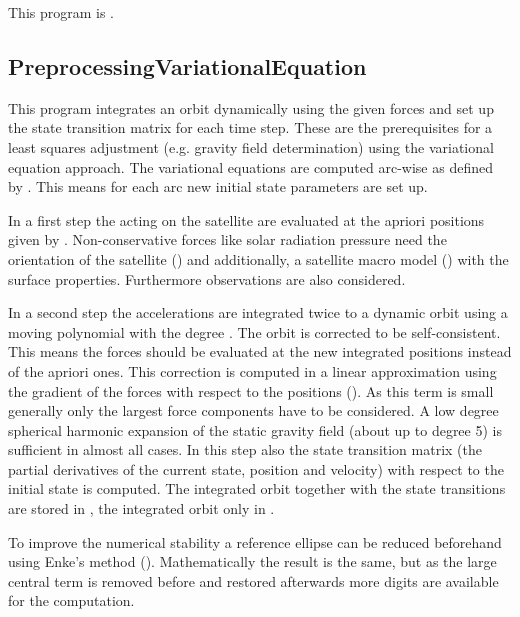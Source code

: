 This program is .
\clearpage
\subsection{PreprocessingVariationalEquation}\label{PreprocessingVariationalEquation}
This program integrates an orbit dynamically using the given forces and set up the state transition matrix
for each time step. These are the prerequisites for a least squares adjustment (e.g. gravity field determination) using
the variational equation approach. The variational equations are computed arc-wise as defined by .
This means for each arc new initial state parameters are set up.

In a first step the  acting on the satellite are evaluated at the apriori positions given
by . Non-conservative forces like solar radiation pressure need the orientation of the
satellite () and additionally, a satellite macro model ()
with the surface properties. Furthermore  observations are also considered.

In a second step the accelerations are integrated twice to a dynamic orbit using a moving polynomial with the degree
. The orbit is corrected to be self-consistent. This means the forces should be evaluated
at the new integrated positions instead of the apriori ones. This correction is computed in a linear approximation
using the gradient of the forces with respect to the positions (). As this term is small generally
only the largest force components have to be considered. A low degree spherical harmonic expansion of the static gravity
field (about up to degree 5) is sufficient in almost all cases. In this step also the state transition matrix (the partial
derivatives of the current state, position and velocity) with respect to the initial state is computed.
The integrated orbit together with the state transitions are stored in ,
the integrated orbit only in .

To improve the numerical stability a reference ellipse can be reduced beforehand using Enke's method ().
Mathematically the result is the same, but as the large central term is removed before and restored
afterwards more digits are available for the computation.

